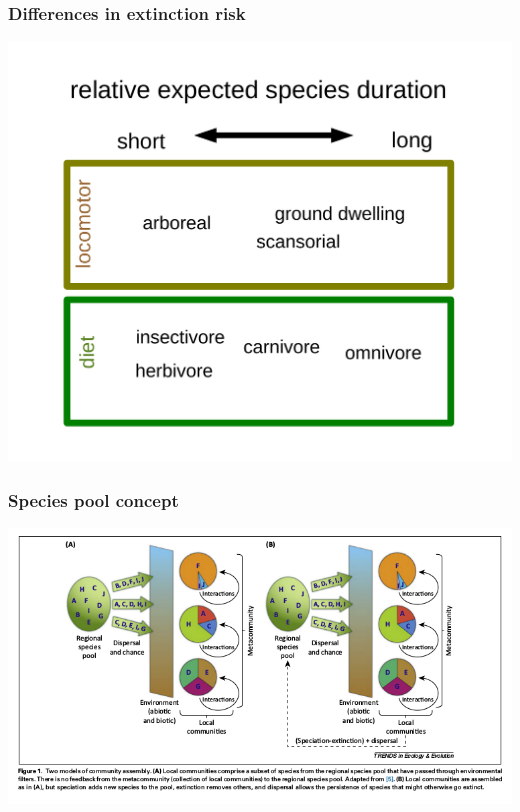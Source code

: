 \documentclass{beamer}
\begin{document}
\begin{frame}
  \frametitle{Differences in extinction risk}
  \begin{center}
    \includegraphics[height=0.8\textheight,width=\textwidth,keepaspectratio=true]{figure/smits_2015_results}
  \end{center}

\end{frame}

\begin{frame}
  \frametitle{Species pool concept}
  \begin{center}
    \includegraphics[height=0.8\textheight,width=\textwidth,keepaspectratio=true]{figure/schemske_pool}
  \end{center}

\end{frame}
\end{document}
